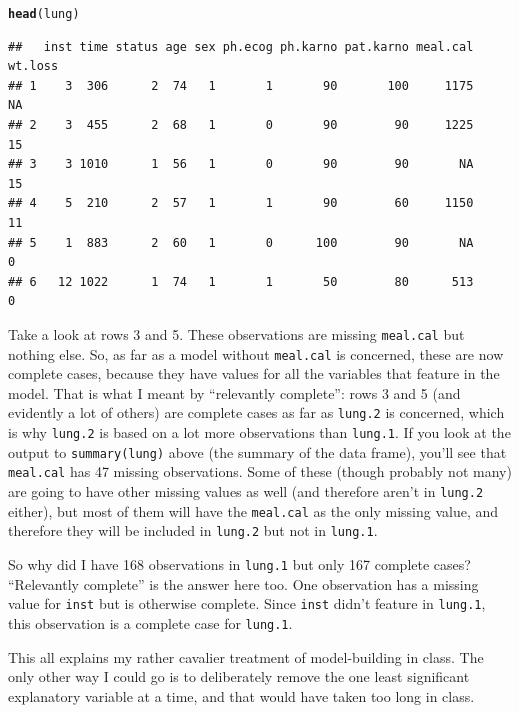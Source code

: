 \documentclass{article}\usepackage[]{graphicx}\usepackage[]{color}
\makeatletter
\newcommand{\hlstd}[1]{\textcolor[rgb]{0.345,0.345,0.345}{#1}}%
\newcommand{\hlkwd}[1]{\textcolor[rgb]{0.737,0.353,0.396}{\textbf{#1}}}%
\newenvironment{kframe}{%
 \def\at@end@of@kframe{}%
 \ifinner\ifhmode%
  \def\at@end@of@kframe{\end{minipage}}%
  \begin{minipage}{\columnwidth}%
 \fi\fi%
 \def\FrameCommand##1{\hskip\@totalleftmargin \hskip-\fboxsep
 \colorbox{shadecolor}{##1}\hskip-\fboxsep
     \hskip-\linewidth \hskip-\@totalleftmargin \hskip\columnwidth}%
 \MakeFramed {\advance\hsize-\width
   \@totalleftmargin\z@ \linewidth\hsize
   \@setminipage}}%
 {\par\unskip\endMakeFramed%
 \at@end@of@kframe}
\newenvironment{knitrout}{}{} %
\makeatother
\begin{document}
\begin{knitrout}
\color{fgcolor}\begin{kframe}
\begin{alltt}
\hlkwd{head}\hlstd{(lung)}
\end{alltt}
\begin{verbatim}
##   inst time status age sex ph.ecog ph.karno pat.karno meal.cal wt.loss
## 1    3  306      2  74   1       1       90       100     1175      NA
## 2    3  455      2  68   1       0       90        90     1225      15
## 3    3 1010      1  56   1       0       90        90       NA      15
## 4    5  210      2  57   1       1       90        60     1150      11
## 5    1  883      2  60   1       0      100        90       NA       0
## 6   12 1022      1  74   1       1       50        80      513       0
\end{verbatim}
\end{kframe}
\end{knitrout}

Take a look at rows 3 and 5. These observations are missing
\texttt{meal.cal} but nothing else. So, as far as a model without
\texttt{meal.cal} is concerned, these are now complete cases, because
they have values for all the variables that feature in the model. That
is what I meant by ``relevantly complete'': rows 3 and 5 (and
evidently a lot of others) are complete cases as far as
\texttt{lung.2} is concerned, which is why \texttt{lung.2} is based on
a lot more observations than \texttt{lung.1}. If you look at the
output to \texttt{summary(lung)} above (the summary of the data
frame), you'll see that \texttt{meal.cal} has 47 missing
observations. Some of these (though probably not many) are going to
have other missing values as well (and therefore aren't in
\texttt{lung.2} either), but most of them will have the
\texttt{meal.cal} as the only missing value, and therefore they will
be included in \texttt{lung.2} but not in \texttt{lung.1}.

So why did I have 168 observations in \texttt{lung.1} but only 167
complete cases? ``Relevantly complete'' is the answer here too. One
observation has a missing value for \texttt{inst} but is otherwise
complete. Since \texttt{inst} didn't feature in \texttt{lung.1}, this
observation is a complete case for \texttt{lung.1}.

This all explains my rather cavalier treatment of model-building in
class. The only other way I could go is to deliberately remove the one
least significant explanatory variable at a time, and that would have
taken too long in class.
\end{document}
